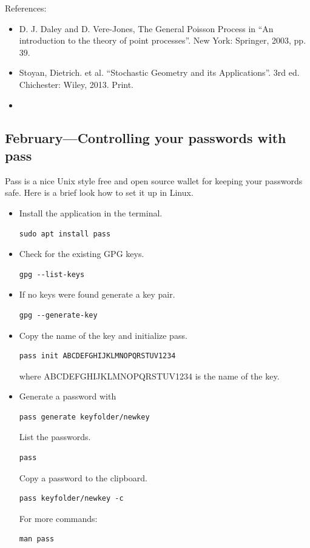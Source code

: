 \documentclass{article}
\begin{document}
References:
\begin{itemize}
\item D. J. Daley and D. Vere-Jones, The General Poisson Process in  ``An introduction to the theory of point processes''. New York: Springer, 2003, pp. 39. 
\item Stoyan, Dietrich. et al. ``Stochastic Geometry and its Applications''. 3rd ed. Chichester: Wiley, 2013. Print.
\item  {}
\end{itemize}




\subsection{February---Controlling your passwords with pass}
Pass is a nice Unix style free and open source wallet for keeping your passwords safe. Here is a brief look how to set it up in Linux.

\begin{itemize}
\item Install the application in the terminal. \\
\begin{verbatim}
sudo apt install pass  
\end{verbatim}
\item Check for the existing GPG keys. \\
\begin{verbatim}
gpg --list-keys 
\end{verbatim}
\item If no keys were found generate a key pair. \\
\begin{verbatim}
gpg --generate-key
\end{verbatim}
\item Copy the name of the key and initialize pass.\\
\begin{verbatim}
pass init ABCDEFGHIJKLMNOPQRSTUV1234
\end{verbatim}
where ABCDEFGHIJKLMNOPQRSTUV1234 is the name of the key.
\item Generate a password with \\
\begin{verbatim}
pass generate keyfolder/newkey 
\end{verbatim}
List the passwords.
\begin{verbatim}
pass
\end{verbatim}
Copy a password to the clipboard. \\
\begin{verbatim}
pass keyfolder/newkey -c
\end{verbatim}
For more commands:
\begin{verbatim}
man pass
\end{verbatim}
\end{itemize}
\end{document}
